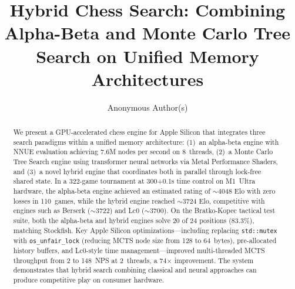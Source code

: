 \documentclass{svproc}
\begin{document}
\mainmatter

\title{Hybrid Chess Search: Combining Alpha-Beta and Monte Carlo Tree Search on Unified Memory Architectures}


\author{Anonymous Author(s)}

\maketitle


\begin{abstract}
We present a GPU-accelerated chess engine for Apple Silicon that integrates three search paradigms within a unified memory architecture: (1)~an alpha-beta engine with NNUE evaluation achieving 7.6M nodes per second on 8~threads, (2)~a Monte Carlo Tree Search engine using transformer neural networks via Metal Performance Shaders, and (3)~a novel hybrid engine that coordinates both in parallel through lock-free shared state. In a 322-game tournament at 300+0.1s time control on M1~Ultra hardware, the alpha-beta engine achieved an estimated rating of $\sim$4048 Elo with zero losses in 110~games, while the hybrid engine reached $\sim$3724 Elo, competitive with engines such as Berserk ($\sim$3722) and Lc0 ($\sim$3700). On the Bratko-Kopec tactical test suite, both the alpha-beta and hybrid engines solve 20 of 24 positions (83.3\%), matching Stockfish. Key Apple Silicon optimizations---including replacing \texttt{std::mutex} with \texttt{os\_unfair\_lock} (reducing MCTS node size from 128 to 64~bytes), pre-allocated history buffers, and Lc0-style time management---improved multi-threaded MCTS throughput from 2 to 148~NPS at 2~threads, a 74$\times$ improvement. The system demonstrates that hybrid search combining classical and neural approaches can produce competitive play on consumer hardware.

\end{abstract}

\end{document}
